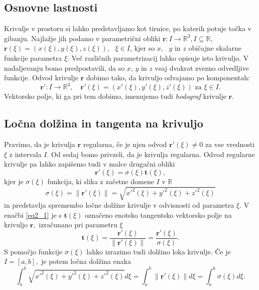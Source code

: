 \documentclass[12pt,a4paper,twoside]{article}
\theoremstyle{definition} %
\theoremstyle{plain} %
\numberwithin{equation}{section}  %
\newcommand{\R}{\mathbb R}
\newcommand{\tV}{\mathbf{t}}
\newcommand{\rV}{\mathbf{r}}
\begin{document}
\subsection{Osnovne lastnosti}

\cite{struik1961lectures}
Krivulje v prostoru si lahko predstavljamo kot tirnice, po katerih potuje točka v gibanju. Najlažje jih podamo
v parametrični obliki $\rV:I \to \R^3, I \subseteq \R$, \newline $\rV(\xi)=(x(\xi),y(\xi),z(\xi)), \text{ } \xi \in I$, kjer so 
$x,\text{ } y \text{ in } z$ običajne skalarne funkcije parametra $\xi.$ Več različnih parametrizacij lahko opisuje
isto krivuljo. V nadaljevanju bomo predpostavili, da so $x$, $y$ in $z$ vsaj dvakrat zvezno odvedljive funkcije.
Odvod krivulje $\rV$ dobimo tako, da krivuljo odvajamo po komponentah:
$$\rV':I \to \R^3, \quad \rV'(\xi)=(x'(\xi),y'(\xi),z'(\xi)) \text{ za } \xi \in I.$$
Vektorsko polje, ki ga pri tem dobimo, imenujemo tudi \textit{hodograf} krivulje $\rV.$

\subsection{Ločna dolžina in tangenta na krivuljo}

\cite{farouki2008pythagorean}
Pravimo, da je krivulja $\rV$ regularna, če je njen odvod $\rV'(\xi) \neq 0$ za vse vrednosti $\xi$ z intervala $I.$ Od sedaj bomo privzeli, da je krivulja regularna. Odvod regularne krivulje pa lahko zapišemo tudi v malce drugačni obliki
\begin{equation}
	\label{eq2_1}
	\rV'(\xi)=\sigma(\xi)\tV(\xi),
\end{equation}
kjer je $\sigma(\xi)$ funkcija, ki slika z začetne domene $I$ v $\R$
\begin{equation}
	\sigma(\xi)=\lVert \rV'(\xi)\rVert=\sqrt{x'^2(\xi)+y'^2(\xi)+z'^2(\xi)}
\end{equation}
in predstavlja spremembo ločne dolžine krivulje v odvisnosti od parametra $\xi.$ V enačbi \eqref{eq2_1} je s $\tV(\xi)$ označeno enotsko tangentsko vektorsko polje na krivuljo $\rV,$ izračunano pri parametru $\xi$
\begin{equation}
	\tV(\xi)=\frac{\rV'(\xi)}{\lVert \rV'(\xi) \rVert}=
	\frac{\rV'(\xi)}{\sigma(\xi)}.
\end{equation}
S pomočjo funkcije $\sigma(\xi)$ lahko izrazimo tudi dolžino loka krivulje. Če je $I=[a,b],$ je potem ločna dolžina enaka
\begin{equation}
	\int_a^b\sqrt{x'^2(\xi)+y'^2(\xi)+z'^2(\xi)}d\xi=\int_a^b\lVert \rV'(\xi) \rVert d\xi =\int_a^b\sigma(\xi)d\xi.
\end{equation}
\end{document}
